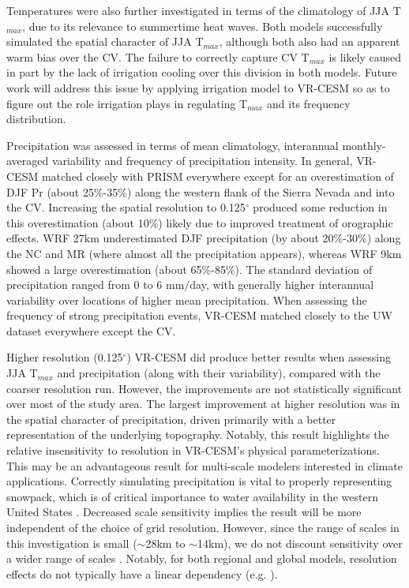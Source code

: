 \documentclass[draft,ms]{agutex}   %
\begin{document}
\begin{article}
Temperatures were also further investigated in terms of the climatology of JJA T$_{max}$, due to its relevance to summertime heat waves.  Both models successfully simulated the spatial character of JJA T$_{max}$, although both also had an apparent warm bias over the CV.  The failure to correctly capture CV T$_{max}$ is likely caused in part by the lack of irrigation cooling over this division in both models. Future work will address this issue by applying irrigation model to VR-CESM so as to figure out the role irrigation plays in regulating T$_{max}$ and its frequency distribution.


Precipitation was assessed in terms of mean climatology, interannual monthly-averaged variability and frequency of precipitation intensity.  In general, VR-CESM matched closely with PRISM everywhere except for an  overestimation of DJF Pr (about 25$\%$-35$\%$) along the western flank of the Sierra Nevada and into the CV. Increasing the spatial resolution to 0.125$^\circ$ produced some reduction in this overestimation (about 10$\%$) likely due to improved treatment of orographic effects. WRF 27km underestimated DJF precipitation (by about 20$\%$-30$\%$) along the NC and MR (where almost all the precipitation appears), whereas WRF 9km showed a large overestimation (about 65$\%$-85$\%$). The standard deviation of precipitation ranged from 0 to 6 mm$/$day, with generally higher interannual variability over locations of higher mean precipitation. When assessing the frequency of strong precipitation events, VR-CESM matched closely to the UW dataset everywhere except the CV.

Higher resolution (0.125$^\circ$) VR-CESM did produce better results when assessing JJA T$_{max}$ and precipitation (along with their variability), compared with the coarser resolution run. However, the improvements are not statistically significant over most of the study area.  The largest improvement at higher resolution was in the spatial character of precipitation, driven primarily with a better representation of the underlying topography. Notably, this result highlights the relative insensitivity to resolution in VR-CESM's physical parameterizations. This may be an advantageous result for multi-scale modelers interested in climate applications. Correctly simulating precipitation is vital to properly representing snowpack, which is of critical importance to water availability in the western United States \citep{bales2006mountain, wise2012hydroclimatology, Rhoades2015Characterizing}. Decreased scale sensitivity implies the result will be more independent of the choice of grid resolution. However, since the range of scales in this investigation is small ($\sim$28km to $\sim$14km), we do not discount sensitivity over a wider range of scales \citep{wehner2010effect, rauscher2010resolution}. Notably, for both regional and global models, resolution effects do not typically have a linear dependency (e.g. \cite{hughes2014landfall, wehner2014effect}).


\end{article}
\end{document}
